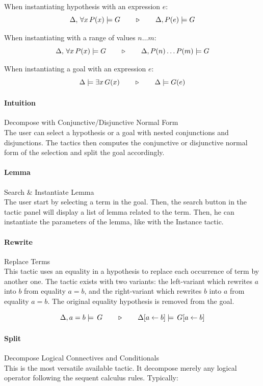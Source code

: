 When instantiating hypothesis with an expression $e$:
$$\Delta,\,\forall x\, P(x)\models G\quad\quad\triangleright\quad\quad\Delta,P(e)\models G$$

When instantiating with a range of values $n\ldots m$:
$$\Delta,\,\forall x\, P(x)\models G\quad\quad\triangleright\quad\quad\Delta,P(n)\ldots P(m)\models G$$

When instantiating a goal with an expression $e$:
$$\Delta\models \exists x\,G(x)\quad\quad\triangleright\quad\quad\Delta\models G(e)$$

\paragraph{Intuition} Decompose with Conjunctive/Disjunctive Normal Form\\
The user can select a hypothesis or a goal with nested conjunctions and disjunctions. The tactics then computes the conjunctive or disjunctive normal form of the selection and split the goal accordingly.

\paragraph{Lemma} Search \& Instantiate Lemma\\
The user start by selecting a term in the goal. Then, the search button in the tactic panel will display a list of lemma related to the term. Then, he can instantiate the parameters of the lemma, like with the Instance tactic.

\paragraph{Rewrite} Replace Terms\\
This tactic uses an equality in a hypothesis to replace each occurrence of term by another one.
The tactic exists with two variants: the left-variant which rewrites $a$ into $b$ from equality $a=b$,
and the right-variant which rewrites $b$ into $a$ from equality $a=b$.
The original equality hypothesis is removed from the goal.

$$\Delta,a=b\models\,G\quad\quad\triangleright\quad\quad\Delta[a\leftarrow b]\models\,G[a\leftarrow b]$$

\paragraph{Split} Decompose Logical Connectives and Conditionals\\
This is the most versatile available tactic. It decompose merely any logical operator following the sequent calculus rules. Typically:

